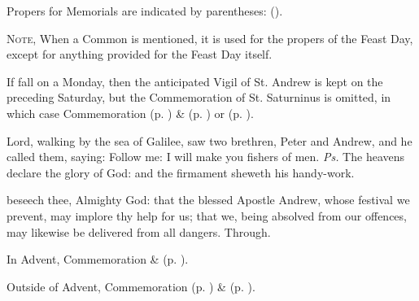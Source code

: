 \fancyhead[RO,LE]{}
\fancyhead[RE,LO]{}
{}

\begin{rubric}
	Propers for Memorials are indicated by parentheses: ().
\end{rubric}

\begin{rubric}
	\textsc{Note,} When a Common is mentioned, it is used for the propers of the Feast Day, except for anything provided for the Feast Day itself.
\end{rubric}


\begin{rubric}
	If  fall on a Monday, then the anticipated Vigil of St. Andrew is kept on the preceding Saturday, but the Commemoration of St. Saturninus is omitted, in which case Commemoration  (p. \pageref{SPMaryInAdvent}) \&  (p. \pageref{SPAgainst}) or  (p. \pageref{SPChiefBishop}).
\end{rubric}

\introit
{} Lord, walking by the sea of Galilee, saw two brethren, Peter and Andrew, and he called them, saying: Follow me: I will make you fishers of men. \textit{Ps.} The heavens declare the glory of God: and the firmament sheweth his handy-work.

\collect
{} beseech thee, Almighty God: that the blessed Apostle Andrew, whose festival we prevent, may implore thy help for us; that we, being absolved from our offences, may likewise be delivered from all dangers. Through.

\begin{rubric}
	In Advent, Commemoration  \&  (p. \pageref{SaturninusCollect}).
\end{rubric}
\begin{rubric}
	Outside of Advent, Commemoration  (p. \pageref{SaturninusCollect}) \&  (p. \pageref{SPMaryInEaster}).
\end{rubric}

